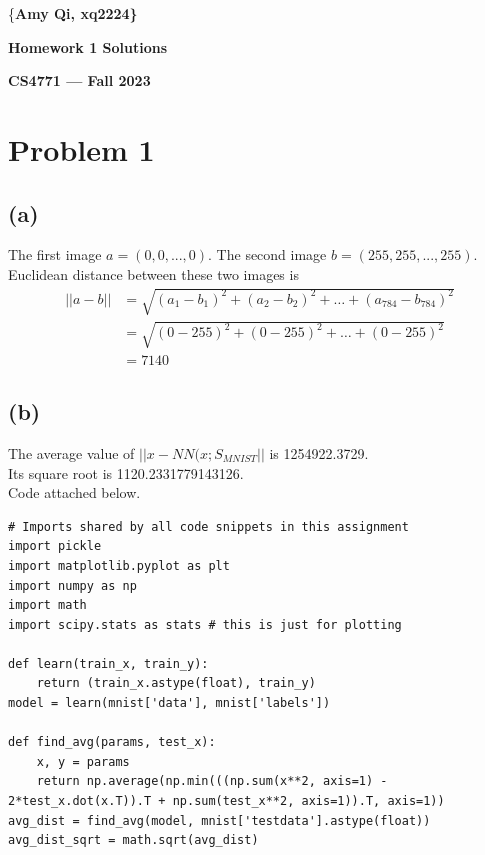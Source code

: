 \documentclass[11pt]{article}
\begin{document}
\centerline{\{\bf Amy Qi, xq2224\}}
\centerline{\bf Homework 1 Solutions}
\centerline{\bf CS4771 --- Fall 2023}

\bigskip 
\bigskip

\section{Problem 1}
\subsection{(a)}
The first image $a = (0,0,...,0)$. The second image $b = (255,255,...,255)$. \\
Euclidean distance between these two images is
\begin{equation}
    \begin{split}
        ||a-b|| &= \sqrt{(a_1-b_1)^2 + (a_2-b_2)^2 +\ldots+(a_{784}-b_{784})^2} \\
        &= \sqrt{(0-255)^2 + (0-255)^2 +\ldots+(0-255)^2} \\
        &= 7140
    \end{split}
\end{equation}

\subsection{(b)}
The average value of $||x-NN(x;S_{MNIST}||$ is 1254922.3729. \\
Its square root is 1120.2331779143126. \\
Code attached below.
\begin{verbatim}
# Imports shared by all code snippets in this assignment
import pickle
import matplotlib.pyplot as plt
import numpy as np
import math
import scipy.stats as stats # this is just for plotting

def learn(train_x, train_y):
    return (train_x.astype(float), train_y)
model = learn(mnist['data'], mnist['labels'])
    
def find_avg(params, test_x):
    x, y = params
    return np.average(np.min(((np.sum(x**2, axis=1) - 2*test_x.dot(x.T)).T + np.sum(test_x**2, axis=1)).T, axis=1))
avg_dist = find_avg(model, mnist['testdata'].astype(float))
avg_dist_sqrt = math.sqrt(avg_dist)
\end{verbatim}

\end{document}
